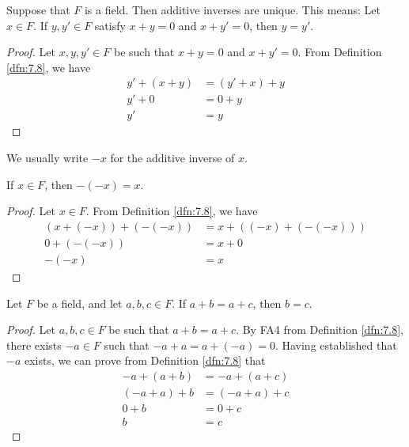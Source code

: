 \documentclass[../main.tex]{subfiles}
\begin{document}
\begin{theorem}\label{trm:7.10}
    Suppose that $F$ is a field. Then additive inverses are unique. This means: Let $x\in F$. If $y,y'\in F$ satisfy $x+y=0$ and $x+y'=0$, then $y=y'$.
    \begin{proof}
        Let $x,y,y'\in F$ be such that $x+y=0$ and $x+y'=0$. From Definition \ref{dfn:7.8}, we have
        \begin{align*}
            y'+(x+y) &= (y'+x)+y\tag*{FA2}\\
            y'+0 &= 0+y\tag*{FA4}\\
            y' &= y\tag*{FA3}
        \end{align*}
    \end{proof}
\end{theorem}

We usually write $-x$ for the additive inverse of $x$.

\begin{corollary}\label{cly:7.11}
    If $x\in F$, then $-(-x)=x$.
    \begin{proof}
        Let $x\in F$. From Definition \ref{dfn:7.8}, we have
        \begin{align*}
            (x+(-x))+(-(-x)) &= x+((-x)+(-(-x)))\tag*{FA2}\\
            0+(-(-x)) &= x+0\tag*{FA4}\\
            -(-x) &= x\tag*{FA3}
        \end{align*}
    \end{proof}
\end{corollary}

\begin{theorem}\label{trm:7.12}
    Let $F$ be a field, and let $a,b,c\in F$. If $a+b=a+c$, then $b=c$.
    \begin{proof}
        Let $a,b,c\in F$ be such that $a+b=a+c$. By FA4 from Definition \ref{dfn:7.8}, there exists $-a\in F$ such that $-a+a=a+(-a)=0$. Having established that $-a$ exists, we can prove from Definition \ref{dfn:7.8} that
        \begin{align*}
            -a+(a+b) &= -a+(a+c)\\
            (-a+a)+b &= (-a+a)+c\tag*{FA2}\\
            0+b &= 0+c\tag*{FA4}\\
            b &= c\tag*{FA3}
        \end{align*}
    \end{proof}
\end{theorem}
\end{document}
